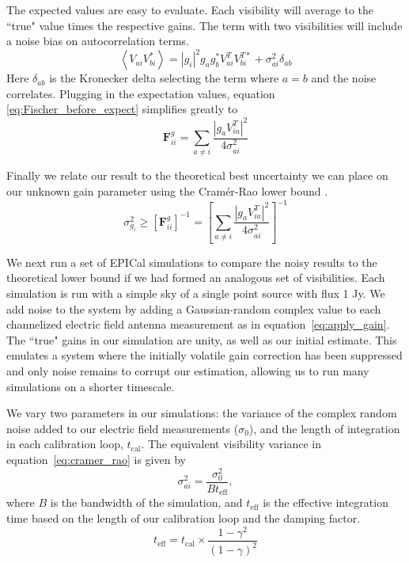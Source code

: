 \documentclass[a4paper,fleqn,usenatbib]{../mnras}
\newcommand{\damp}{\ensuremath{\gamma}}
\begin{document}
The expected values are easy to evaluate. Each visibility will average to the ``true" value times the respective gains. The term with two visibilities will include a noise bias on autocorrelation terms.
\begin{equation}
\left<V_{ai}V_{bi}^*\right> = |g_i|^2 g_a g_b^* V_{ai}^T V_{bi}^{T*} + \sigma_{ai}^2 \delta_{ab}
\end{equation}
Here $\delta_{ab}$ is the Kronecker delta selecting the term where $a=b$ and the noise correlates. Plugging in the expectation values, equation \ref{eq:Fischer_before_expect} simplifies greatly to
\begin{equation}
\mathbf{F}^g_{ii} = \sum_{a \ne i} \frac{\left|g_a V_{ia}^T \right|^2}{4\sigma_{ai}^2}
\end{equation}

Finally we relate our result to the theoretical best uncertainty we can place on our unknown gain parameter using the Cram\'er-Rao lower bound \cite{kay93}.
\begin{equation}\label{eq:cramer_rao}
\sigma_{g_i}^2 \ge \left[ \mathbf{F}^g_{ii} \right]^{-1} = \left[ \sum_{a \ne i} \frac{\left|g_a V_{ia}^T \right|^2}{4\sigma_{ai}^2} \right]^{-1}
\end{equation}

We next run a set of EPICal simulations to compare the noisy results to the theoretical lower bound if we had formed an analogous set of visibilities. Each simulation is run with a simple sky of a single point source with flux 1 Jy. We add noise to the system by adding a Gaussian-random complex value to each channelized electric field antenna measurement as in equation~\ref{eq:apply_gain}. The ``true" gains in our simulation are unity, as well as our initial estimate. This emulates a system where the initially volatile gain correction has been suppressed and only noise remains to corrupt our estimation, allowing us to run many simulations on a shorter timescale.

We vary two parameters in our simulations: the variance of the complex random noise added to our electric field measurements ($\sigma_0$), and the length of integration in each calibration loop, $t_{\mathrm{cal}}$. The equivalent visibility variance in equation~\ref{eq:cramer_rao} is given by
\begin{equation}
\sigma_{ai}^2 = \frac{\sigma_0^2}{B t_{\mathrm{eff}}},
\end{equation}
where $B$ is the bandwidth of the simulation, and $t_{\mathrm{eff}}$ is the effective integration time based on the length of our calibration loop and the damping factor.
\begin{equation}
t_{\mathrm{eff}} = t_{\mathrm{cal}} \times \frac{1-\damp^2}{(1-\damp)^2}
\end{equation}
\end{document}
